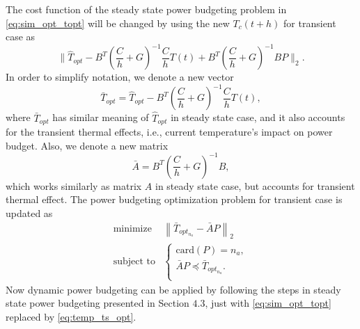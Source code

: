 The cost function of the steady state power budgeting problem in
\eqref{eq:sim_opt_topt} will be changed by using the new $T_c(t+h)$ for
transient case as
\begin{equation}\label{eq:cost_trans}
\|\hat{T}_{opt} -  B^{T}(\frac{C}{h}+G)^{-1}\frac{C}{h}T(t)+B^{T}(\frac{C}{h}+G)^{-1}BP\|_2.
\end{equation}
In order to simplify notation, we denote a new vector  
\begin{equation}
\bar{T}_{opt}=\hat{T}_{opt} - B^{T}(\frac{C}{h}+G)^{-1}\frac{C}{h}T(t),
\end{equation}
where $\bar{T}_{opt}$ has similar meaning of
$\hat{T}_{opt}$ in steady state case, and it also accounts for the transient
thermal effects, i.e., current temperature's impact on power
budget. Also, we denote a new matrix 
\begin{equation}
\bar{A} = B^{T}(\frac{C}{h}+G)^{-1}B, 
\end{equation}
which works similarly as matrix $A$ in steady
state case, but accounts for transient thermal effect. The power
budgeting optimization problem for transient case is updated as 
\begin{equation}\label{eq:temp_ts_opt}
\begin{split}
\text{minimize } &  \left \| \bar{T}_{opt_{n_{a}}}-\bar{A}P \right \|_{2}\\
\text{subject to} &\left\{
\begin{array}{lr}
\text{card}(P) = n_{a},\\
\bar{A}P \preceq \bar{T}_{opt_{n_{a}}}.\\
\end{array}
\right.
\end{split}
\end{equation}
Now dynamic power budgeting can be
applied by following the steps in steady state power budgeting presented in
Section $4.3$, just with \eqref{eq:sim_opt_topt} replaced
by \eqref{eq:temp_ts_opt}.


